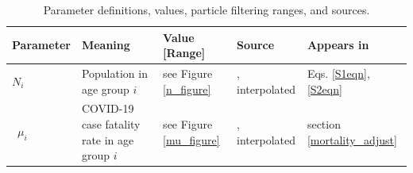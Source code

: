 \begin{table}[H]
\tiny
 \centering
  \caption{Parameter definitions, values, particle filtering ranges, and sources.}
  \begin{tabular}{p{1cm} p{5cm} p{2cm} l l}
  Parameter & Meaning & Value [Range] & Source & Appears in\\
  \midrule
  $N_i$         & Population in age group $i$  & see Figure \ref{n_figure} & \cite{ontario_census}, interpolated & Eqs. \ref{S1eqn},\ref{S2eqn} \\\
  $\mu_i$       & COVID-19 case fatality rate in age group $i$ & see Figure \ref{mu_figure} & \cite{publichealthontario}, interpolated & section \ref{mortality_adjust} \\

  
                

\end{tabular}
\end{table}
